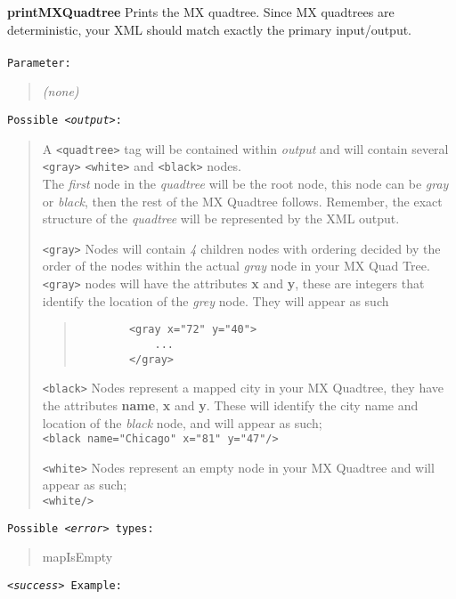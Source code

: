 \documentclass[12pt]{article}
\newenvironment{Description}
   {\begin{list}{}{\let\makelabel\Descriptionlabel
      \setlength\leftmargin{\labelwidth+\labelsep}
      \setlength\itemindent{-0.3em}}}%
   {\end{list}}
\newcommand*{\Descriptionlabel}[1]{%
  \parbox[b]{\labelwidth}
  {\makebox[0pt][l]{\textbf{#1}}\\}
  \hfill}
\begin{document}
\begin{Description}
\begin{Description}
	\item[\textbf{printMXQuadtree}]
	Prints the MX quadtree.
	Since MX quadtrees are deterministic, your XML should match exactly
	the primary input/output.\\\\
	\texttt{Parameter:}
	\begin{quote}
		\emph{(none)}
	\end{quote}
	\texttt{Possible \emph{<output>}:}
	\begin{quote}
		 A \texttt{<quadtree>} tag will be contained within \emph{output} and will contain
		 several \texttt{<gray>} \texttt{<white>} and \texttt{<black>} nodes. \\
		The \emph{first} node in the \emph{quadtree} will be the root node, this node can be \emph{gray} or \emph{black}, then the rest of the MX Quadtree follows. Remember, the exact structure of the \emph{quadtree} will be represented by the XML output.
		\begin{Description}
		\item[\texttt{<gray>}] Nodes will contain \emph{4} children nodes with ordering decided by the order of the nodes within the actual \emph{gray} node in your MX Quad Tree.\texttt{<gray>} nodes will have the attributes \textbf{x} and \textbf{y}, these are integers that identify the location of the \emph{grey} node. They will appear as such
		\begin{quote}
		\begin{verbatim}
		<gray x="72" y="40">
		    ...
		</gray>
		\end{verbatim}
		\end{quote}
		\item[\texttt{<black>}] Nodes represent a mapped city in your MX Quadtree, they have the attributes \textbf{name}, \textbf{x} and \textbf{y}. These will identify the city name and location of the \emph{black} node, and will appear as such;\\
		\texttt{<black name="Chicago" x="81" y="47"/>}\\
		\item[\texttt{<white>}] Nodes represent an empty node in your MX Quadtree and will appear as such;\\
		\texttt{<white/>}
		\end{Description}
	\end{quote}
	   	\texttt{Possible \emph{<error>} types:}
	\begin{quote}
		mapIsEmpty
	\end{quote}
	\texttt{\emph{<success>} Example:}

\end{Description}
\end{Description}
\end{document}
